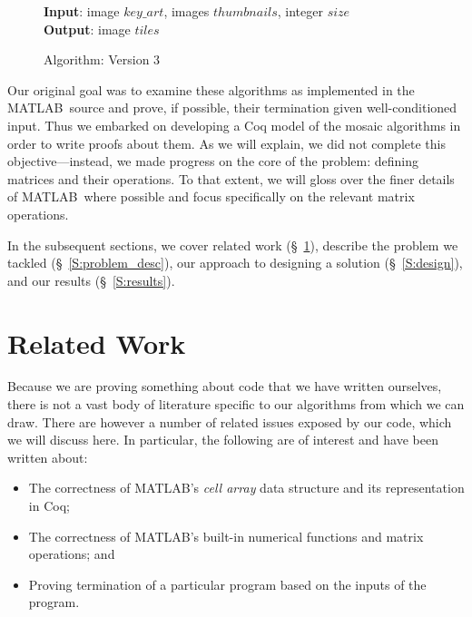 \documentclass[11pt,conference]{IEEEtran}
\newcommand{\matlab}{MATLAB}
\theoremstyle{plain} %
\theoremstyle{definition}
\theoremstyle{remark}
\begin{document}
\begin{figure}[htp]
    \textbf{Input}: image \(key\_art\), images \(thumbnails\), integer \(size\) \\
    \textbf{Output}: image \(tiles\)
    \begin{algorithmic}
        \STATE{}
        \STATE{}
        \ENDFOR
        \ENDFOR
    \end{algorithmic}
    \caption{Algorithm: Version 3}\label{alg:v3}
\end{figure}

Our original goal was to examine these algorithms as implemented in the \matlab\
source and prove, if possible, their termination given well-conditioned input.
Thus we embarked on developing a Coq model of the mosaic algorithms in order to
write proofs about them. As we will explain, we did not complete this
objective---instead, we made progress on the core of the problem: defining
matrices and their operations. To that extent, we will gloss over the finer
details of \matlab\ where possible and focus specifically on the relevant matrix
operations.

In the subsequent sections, we cover related work (\S~\ref{S:related_work}),
describe the problem we tackled (\S~\ref{S:problem_desc}), our approach to
designing a solution (\S~\ref{S:design}), and our results (\S~\ref{S:results}).

\section{Related Work}\label{S:related_work}

Because we are proving something about code that we have written ourselves,
there is not a vast body of literature specific to our algorithms from which we
can draw. There are however a number of related issues exposed by our code,
which we will discuss here. In particular, the following are of interest and
have been written about:

\begin{itemize}
    \item The correctness of \matlab's \textit{cell array} data structure and
        its representation in Coq;
    \item The correctness of \matlab's built-in numerical functions and matrix
        operations; and
    \item Proving termination of a particular program based on the inputs of the
        program.
\end{itemize}
\end{document}
